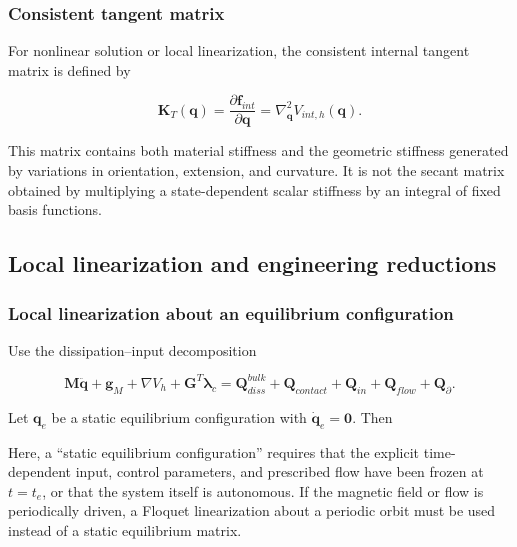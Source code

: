 \subsubsection{Consistent tangent matrix}\label{sec:galerkin-2-9-3}

For nonlinear solution or local linearization, the consistent internal tangent matrix is defined by

\begin{equation}
\label{eq:galerkin-2-107}
\mathbf{K}_{T}\left( \mathbf{q} \right) = \frac{\partial\mathbf{f}_{int}}{\partial\mathbf{q}} = \nabla_{\mathbf{q}}^{2}V_{int,h}\left( \mathbf{q} \right).
\end{equation}

This matrix contains both material stiffness and the geometric stiffness generated by variations in orientation, extension, and curvature. It is not the secant matrix obtained by multiplying a state-dependent scalar stiffness by an integral of fixed basis functions.

\subsection{Local linearization and engineering reductions}\label{sec:galerkin-2-10}

\subsubsection{Local linearization about an equilibrium configuration}\label{sec:galerkin-2-10-1}

Use the dissipation--input decomposition

\begin{equation}
\label{eq:galerkin-2-108}
\mathbf{M}\ddot{\mathbf{q}} + \mathbf{g}_{M} + \nabla V_{h} + \mathbf{G}^{T}\bm{\lambda}_{c} = \mathbf{Q}_{diss}^{bulk} + \mathbf{Q}_{contact} + \mathbf{Q}_{in} + \mathbf{Q}_{flow} + \mathbf{Q}_{\partial}.
\end{equation}

Let \(\mathbf{q}_{e}\) be a static equilibrium configuration with \({\dot{\mathbf{q}}}_{e} = \mathbf{0}\). Then

Here, a ``static equilibrium configuration'' requires that the explicit time-dependent input, control parameters, and prescribed flow have been frozen at \(t = t_{e}\), or that the system itself is autonomous. If the magnetic field or flow is periodically driven, a Floquet linearization about a periodic orbit must be used instead of a static equilibrium matrix.

